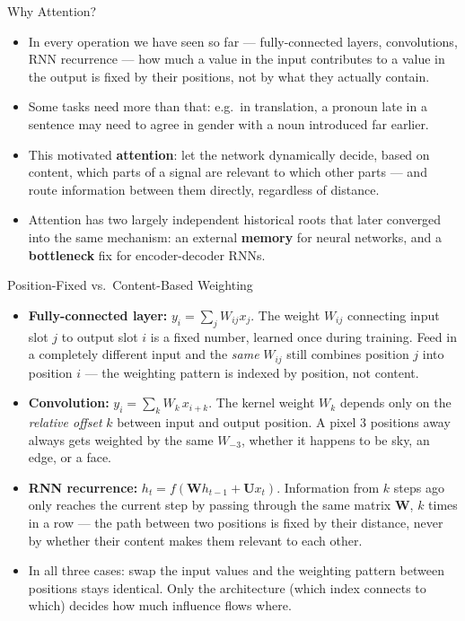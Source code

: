 \begin{vbframe}{Why Attention?}
\begin{itemize}
  \item In every operation we have seen so far --- fully-connected layers, convolutions, RNN recurrence --- how much a value in the input contributes to a value in the output is fixed by their positions, not by what they actually contain.
  \item Some tasks need more than that: e.g.\ in translation, a pronoun late in a sentence may need to agree in gender with a noun introduced far earlier.
  \item This motivated \textbf{attention}: let the network dynamically decide, based on content, which parts of a signal are relevant to which other parts --- and route information between them directly, regardless of distance.
  \item Attention has two largely independent historical roots that later converged into the same mechanism: an external \textbf{memory} for neural networks, and a \textbf{bottleneck} fix for encoder-decoder RNNs.
\end{itemize}
\end{vbframe}

\begin{vbframe}{Position-Fixed vs.\ Content-Based Weighting}
\begin{itemize}
  \item \textbf{Fully-connected layer:} $y_i = \sum_j W_{ij} x_j$. The weight $W_{ij}$ connecting input slot $j$ to output slot $i$ is a fixed number, learned once during training. Feed in a completely different input and the \emph{same} $W_{ij}$ still combines position $j$ into position $i$ --- the weighting pattern is indexed by position, not content.
  \item \textbf{Convolution:} $y_i = \sum_k W_k \, x_{i+k}$. The kernel weight $W_k$ depends only on the \emph{relative offset} $k$ between input and output position. A pixel 3 positions away always gets weighted by the same $W_{-3}$, whether it happens to be sky, an edge, or a face.
  \item \textbf{RNN recurrence:} $h_t = f(\mathbf{W} h_{t-1} + \mathbf{U} x_t)$. Information from $k$ steps ago only reaches the current step by passing through the same matrix $\mathbf{W}$, $k$ times in a row --- the path between two positions is fixed by their distance, never by whether their content makes them relevant to each other.
  \item In all three cases: swap the input values and the weighting pattern between positions stays identical. Only the architecture (which index connects to which) decides how much influence flows where.
\end{itemize}
\end{vbframe}

